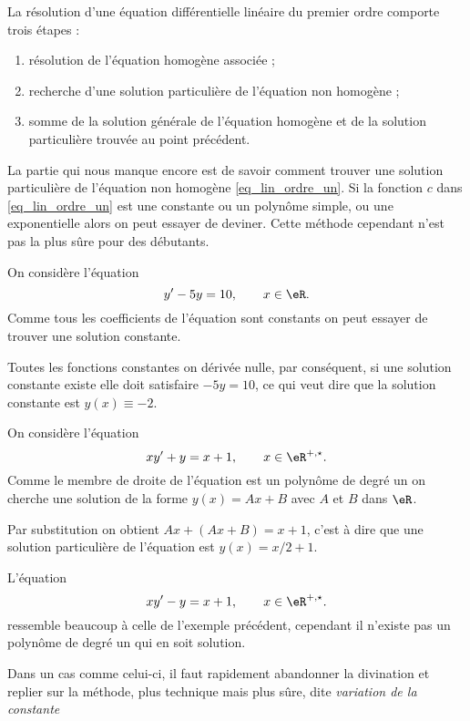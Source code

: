 \begin{Aretenir}
  La résolution d'une équation différentielle linéaire du premier ordre comporte trois étapes :
  \begin{enumerate}
  \item résolution de l'équation homogène associée ;
  \item recherche d'une solution particulière de l'équation non homogène ;
  \item somme de la solution générale de l'équation homogène et de la solution particulière trouvée au point précédent.
  \end{enumerate}
\end{Aretenir}
La partie qui nous manque encore est de savoir comment trouver une solution particulière de l'équation non homogène \eqref{eq_lin_ordre_un}. Si la fonction $c$ dans \eqref{eq_lin_ordre_un} est une constante ou un polynôme simple, ou une exponentielle alors on peut essayer de deviner. Cette méthode cependant n'est pas la plus sûre pour des débutants.

\begin{example}
  On considère l'équation
  \begin{equation}
    y'-5y = 10, \qquad x\in\eR.
  \end{equation}
Comme tous les coefficients de l'équation sont constants on peut essayer de trouver une solution constante.

Toutes les fonctions constantes on dérivée nulle, par conséquent, si une solution constante existe elle doit satisfaire $-5y = 10$, ce qui veut dire que la solution constante est $y(x)\equiv -2$.
\end{example}

\begin{example}
  On considère l'équation
  \begin{equation}
    xy'+y = x+1, \qquad x\in\eR^{+,\star}.
  \end{equation}
Comme le membre de droite de l'équation est un polynôme de degré un on cherche une solution de la forme $y(x) = Ax + B$ avec $A$ et $B$ dans $\eR$.

Par substitution on obtient $Ax + (Ax +B) = x+1$, c'est à dire que une solution particulière de l'équation est $y(x) = x/2+1$.
\end{example}

\begin{example}
   L'équation
  \begin{equation}
    xy'-y = x+1, \qquad x\in\eR^{+,\star}.
  \end{equation}
ressemble beaucoup à celle de l'exemple précédent, cependant il n'existe pas un polynôme de degré un qui en soit solution.

Dans un cas comme celui-ci, il faut rapidement abandonner la divination et replier sur la méthode, plus technique mais plus sûre, dite  \emph{variation de la constante}
\end{example}


